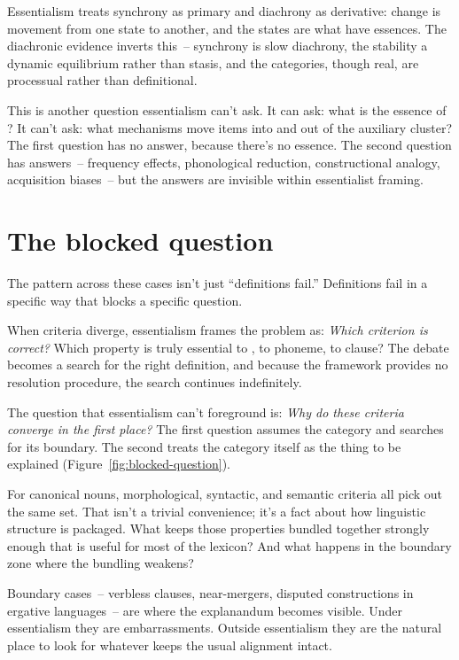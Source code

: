 Essentialism treats synchrony as primary and diachrony as derivative: change is movement from one state to another, and the states are what have essences. The diachronic evidence inverts this~-- synchrony is slow diachrony, the stability a dynamic equilibrium rather than stasis, and the categories, though real, are processual rather than definitional.

This is another question essentialism can't ask. It can ask: what is the essence of ? It can't ask: what mechanisms move items into and out of the auxiliary cluster? The first question has no answer, because there's no essence. The second question has answers~-- frequency effects, phonological reduction, constructional analogy, acquisition biases~-- but the answers are invisible within essentialist framing.

\section{The blocked question}
\label{sec:2:the-blocked-question}

The pattern across these cases isn't just \enquote{definitions fail.} Definitions fail in a specific way that blocks a specific question.

When criteria diverge, essentialism frames the problem as: \emph{Which criterion is correct?} Which property is truly essential to , to phoneme, to clause? The debate becomes a search for the right definition, and because the framework provides no resolution procedure, the search continues indefinitely.

The question that essentialism can't foreground is: \emph{Why do these criteria converge in the first place?} The first question assumes the category and searches for its boundary. The second treats the category itself as the thing to be explained (Figure~\ref{fig:blocked-question}).

For canonical nouns, morphological, syntactic, and semantic criteria all pick out the same set. That isn't a trivial convenience; it's a fact about how linguistic structure is packaged. What keeps those properties bundled together strongly enough that  is useful for most of the lexicon? And what happens in the boundary zone where the bundling weakens?

Boundary cases~-- verbless clauses, near-mergers, disputed  constructions in ergative languages~-- are where the explanandum becomes visible. Under essentialism they are embarrassments. Outside essentialism they are the natural place to look for whatever keeps the usual alignment intact.

